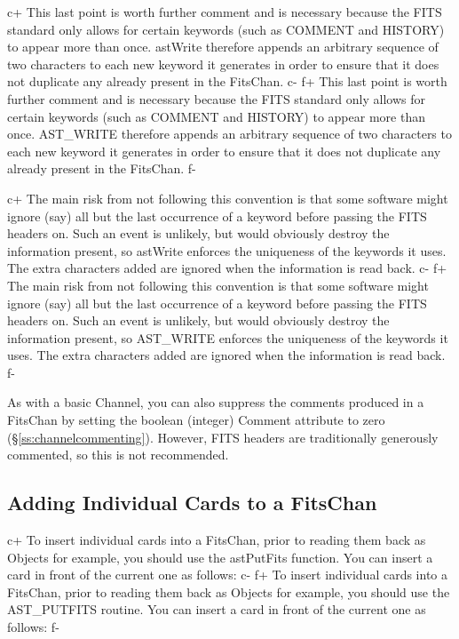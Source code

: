 \documentclass[twoside,11pt]{article}
\newcommand{\secref}[1]{\S\ref{#1}}
\newcommand{\secref}[1]{\ref{#1}}
\begin{document}
c+
This last point is worth further comment and is necessary because the
FITS standard only allows for certain keywords (such as COMMENT and
HISTORY) to appear more than once. astWrite therefore appends an
arbitrary sequence of two characters to each new keyword it generates
in order to ensure that it does not duplicate any already present in
the FitsChan.
c-
f+
This last point is worth further comment and is necessary because the
FITS standard only allows for certain keywords (such as COMMENT and
HISTORY) to appear more than once. AST\_WRITE therefore appends an
arbitrary sequence of two characters to each new keyword it generates
in order to ensure that it does not duplicate any already present in
the FitsChan.
f-

c+
The main risk from not following this convention is that some software
might ignore (say) all but the last occurrence of a keyword before
passing the FITS headers on. Such an event is unlikely, but would
obviously destroy the information present, so astWrite enforces the
uniqueness of the keywords it uses. The extra characters added are
ignored when the information is read back.
c-
f+
The main risk from not following this convention is that some software
might ignore (say) all but the last occurrence of a keyword before
passing the FITS headers on. Such an event is unlikely, but would
obviously destroy the information present, so AST\_WRITE enforces the
uniqueness of the keywords it uses. The extra characters added are
ignored when the information is read back.
f-

As with a basic Channel, you can also suppress the comments produced
in a FitsChan by setting the boolean (integer) Comment attribute to
zero (\secref{ss:channelcommenting}). However, FITS headers are
traditionally generously commented, so this is not recommended.

\subsection{\label{ss:addingfitscards}Adding Individual Cards to a FitsChan}

c+
To insert individual cards into a FitsChan, prior to reading them back
as Objects for example, you should use the astPutFits function. You
can insert a card in front of the current one as follows:
c-
f+
To insert individual cards into a FitsChan, prior to reading them back
as Objects for example, you should use the AST\_PUTFITS routine. You
can insert a card in front of the current one as follows:
f-
\end{document}
